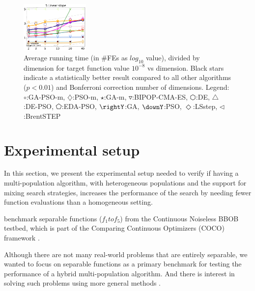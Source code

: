 \documentclass[runningheads]{llncs}
\begin{document}
\begin{figure}[h!tb]
\begin{tabular}
  \includegraphics[width=0.30\textwidth]{ppfigs_f005}
  \end{tabular}
  \vspace{-3ex}
   \caption{Average running time (in \#FEs as $log_{10}$ value),
    divided by dimension for target function value $10^{-8}$ vs dimension. 
    Black stars indicate a statistically better result compared to 
    all other algorithms ($p < 0.01$) and Bonferroni 
    correction number of dimensions. 
    Legend: {\color{NavyBlue}$\circ$}:GA-PSO-m, 
    {\color{Magenta}$\diamondsuit$}:PSO-m, 
    {\color{Orange}$\star$}:GA-m, 
    {\color{CornflowerBlue}$\triangledown$}:BIPOP-CMA-ES,
    {\color{red}$\varhexagon$}:DE, 
    {\color{YellowGreen}$\triangle$}:DE-PSO, 
    {\color{cyan}$\pentagon$}:EDA-PSO, 
    {\color{GreenYellow}$\rightY$}:GA, 
    {\color{ForestGreen}$\downY$}:PSO, 
    {\color{Lavender}$\Diamond$}:LSstep, 
    {\color{SkyBlue}$\triangleleft$}:BrentSTEP
    } 
  \label{fig:avg}
\end{figure}
%
\section{Experimental setup}
\label{setup}

In this section, we present the experimental setup needed 
to verify if having a multi-population algorithm, with
heterogeneous populations and the support for mixing search strategies,
increases the performance of the search by needing fewer function evaluations
than a homogeneous setting.

benchmark separable functions ($f_1 to f_5 $) from the Continuous Noiseless
BBOB testbed, which is part of the Comparing Continuous Optimizers (COCO)
framework \cite{hansen2016coco}. 

Although there are not many real-world
problems that are entirely separable, we wanted to focus on separable functions
as a primary benchmark for testing the performance of a hybrid multi-population
algorithm. And there is interest in solving such problems using more
general methods \cite{doerr2013evolutionary,swarzberg1994step}. %
\end{document}
